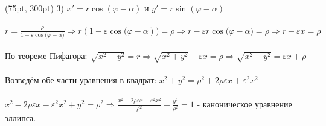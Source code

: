 \documentclass{article}
\begin{document}
\begin{textblock*}{450pt}(75pt, 300pt)
3) \large $x' =r \cos{(\varphi - \alpha)}$  и $y' = r \sin{(\varphi - \alpha)}$ \\
\hspace{0em} \\
\large{$r = \frac{\rho}{1 - \varepsilon\cos{(\varphi - \alpha})} \Rightarrow r(1 - \varepsilon\cos{(\varphi - \alpha})) = \rho \Rightarrow r - \varepsilon r \cos{(\varphi - \alpha}) = \rho \Rightarrow r - \varepsilon x = \rho$} \\
\hspace{0em} \\
По теореме Пифагора: $\sqrt{x^2 + y^2} = r \Rightarrow \sqrt{x^2 + y^2} - \varepsilon x = \rho \Rightarrow \sqrt{x^2 + y^2} = \varepsilon x + \rho$ \\
\hspace{0em} \\
Возведём обе части уравнения в квадрат: $x^2 + y^2 = \rho^2 + 2 \rho \varepsilon x + \varepsilon^2 x^2$ \\
\hspace{0em}\\
$x^2 - 2 \rho \varepsilon x - \varepsilon^2 x^2  + y^2 = \rho^2 \Rightarrow \frac{x^2 - 2 \rho \varepsilon x - \varepsilon^2 x^2}{\rho^2} + \frac{y^2}{\rho^2} = 1$ - \normalsize каноническое уравнение эллипса.
\end{textblock*}
\end{document}
